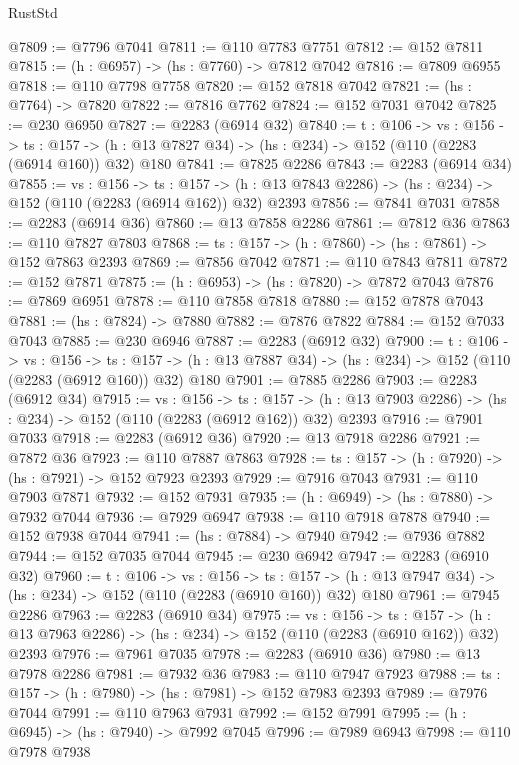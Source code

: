 \begin{lexlean}{RustStd}
\begin{coremodule}
@7809 := @7796 @7041
@7811 := @110 @7783 @7751
@7812 := @152 @7811
@7815 := (h : @6957) -> (hs : @7760) -> @7812 @7042
@7816 := @7809 @6955
@7818 := @110 @7798 @7758
@7820 := @152 @7818 @7042
@7821 := (hs : @7764) -> @7820
@7822 := @7816 @7762
@7824 := @152 @7031 @7042
@7825 := @230 @6950
@7827 := @2283 (@6914 @32)
@7840 := {t : @106} ->
  {vs : @156} ->
  {ts : @157} -> (h : @13 @7827 @34) -> (hs : @234) -> @152 (@110 (@2283 (@6914 @160)) @32) @180
@7841 := @7825 @2286
@7843 := @2283 (@6914 @34)
@7855 := {vs : @156} ->
  {ts : @157} -> (h : @13 @7843 @2286) -> (hs : @234) -> @152 (@110 (@2283 (@6914 @162)) @32) @2393
@7856 := @7841 @7031
@7858 := @2283 (@6914 @36)
@7860 := @13 @7858 @2286
@7861 := @7812 @36
@7863 := @110 @7827 @7803
@7868 := {ts : @157} -> (h : @7860) -> (hs : @7861) -> @152 @7863 @2393
@7869 := @7856 @7042
@7871 := @110 @7843 @7811
@7872 := @152 @7871
@7875 := (h : @6953) -> (hs : @7820) -> @7872 @7043
@7876 := @7869 @6951
@7878 := @110 @7858 @7818
@7880 := @152 @7878 @7043
@7881 := (hs : @7824) -> @7880
@7882 := @7876 @7822
@7884 := @152 @7033 @7043
@7885 := @230 @6946
@7887 := @2283 (@6912 @32)
@7900 := {t : @106} ->
  {vs : @156} ->
  {ts : @157} -> (h : @13 @7887 @34) -> (hs : @234) -> @152 (@110 (@2283 (@6912 @160)) @32) @180
@7901 := @7885 @2286
@7903 := @2283 (@6912 @34)
@7915 := {vs : @156} ->
  {ts : @157} -> (h : @13 @7903 @2286) -> (hs : @234) -> @152 (@110 (@2283 (@6912 @162)) @32) @2393
@7916 := @7901 @7033
@7918 := @2283 (@6912 @36)
@7920 := @13 @7918 @2286
@7921 := @7872 @36
@7923 := @110 @7887 @7863
@7928 := {ts : @157} -> (h : @7920) -> (hs : @7921) -> @152 @7923 @2393
@7929 := @7916 @7043
@7931 := @110 @7903 @7871
@7932 := @152 @7931
@7935 := (h : @6949) -> (hs : @7880) -> @7932 @7044
@7936 := @7929 @6947
@7938 := @110 @7918 @7878
@7940 := @152 @7938 @7044
@7941 := (hs : @7884) -> @7940
@7942 := @7936 @7882
@7944 := @152 @7035 @7044
@7945 := @230 @6942
@7947 := @2283 (@6910 @32)
@7960 := {t : @106} ->
  {vs : @156} ->
  {ts : @157} -> (h : @13 @7947 @34) -> (hs : @234) -> @152 (@110 (@2283 (@6910 @160)) @32) @180
@7961 := @7945 @2286
@7963 := @2283 (@6910 @34)
@7975 := {vs : @156} ->
  {ts : @157} -> (h : @13 @7963 @2286) -> (hs : @234) -> @152 (@110 (@2283 (@6910 @162)) @32) @2393
@7976 := @7961 @7035
@7978 := @2283 (@6910 @36)
@7980 := @13 @7978 @2286
@7981 := @7932 @36
@7983 := @110 @7947 @7923
@7988 := {ts : @157} -> (h : @7980) -> (hs : @7981) -> @152 @7983 @2393
@7989 := @7976 @7044
@7991 := @110 @7963 @7931
@7992 := @152 @7991
@7995 := (h : @6945) -> (hs : @7940) -> @7992 @7045
@7996 := @7989 @6943
@7998 := @110 @7978 @7938

\end{coremodule}
\end{lexlean}
